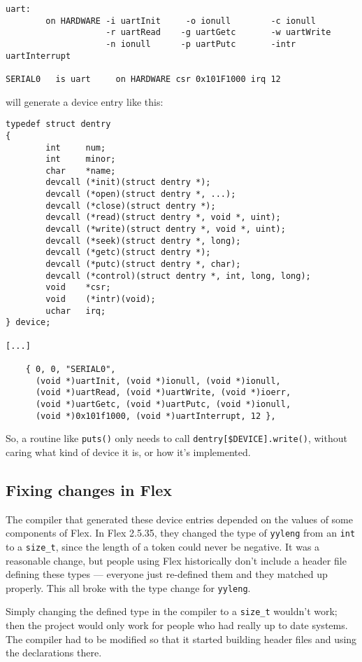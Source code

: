 \documentclass[12pt]{article}
\newcommand{\code}[1]{{\tt #1}}
\begin{document}
\begin{verbatim}
uart:
        on HARDWARE -i uartInit     -o ionull        -c ionull
                    -r uartRead    -g uartGetc       -w uartWrite 
                    -n ionull      -p uartPutc       -intr uartInterrupt

SERIAL0   is uart     on HARDWARE csr 0x101F1000 irq 12
\end{verbatim}

will generate a device entry like this:

\begin{verbatim}
typedef struct dentry
{
        int     num;
        int     minor;
        char    *name;
        devcall (*init)(struct dentry *);
        devcall (*open)(struct dentry *, ...);
        devcall (*close)(struct dentry *);
        devcall (*read)(struct dentry *, void *, uint);
        devcall (*write)(struct dentry *, void *, uint);
        devcall (*seek)(struct dentry *, long);
        devcall (*getc)(struct dentry *);
        devcall (*putc)(struct dentry *, char);
        devcall (*control)(struct dentry *, int, long, long);
        void    *csr;
        void    (*intr)(void);
        uchar   irq;
} device;

[...]

	{ 0, 0, "SERIAL0",
	  (void *)uartInit, (void *)ionull, (void *)ionull,
	  (void *)uartRead, (void *)uartWrite, (void *)ioerr,
	  (void *)uartGetc, (void *)uartPutc, (void *)ionull,
	  (void *)0x101f1000, (void *)uartInterrupt, 12 },
\end{verbatim}

So, a routine like \code{puts()} only needs to call
\code{dentry[\$DEVICE].write()}, without caring what kind of device it is, or
how it's implemented.

\subsection{Fixing changes in Flex}

The compiler that generated these device entries depended on the values of some
components of Flex. In Flex 2.5.35, they changed the type of \code{yyleng} from
an \code{int} to a \code{size\_t}, since the length of a token could never be
negative. It was a reasonable change, but people using Flex historically don't
include a header file defining these types \---- everyone just re-defined them
and they matched up properly. This all broke with the type change for
\code{yyleng}.

Simply changing the defined type in the compiler to a \code{size\_t} wouldn't
work; then the project would only work for people who had really up to date
systems. The compiler had to be modified so that it started building header
files and using the declarations there.
\end{document}
